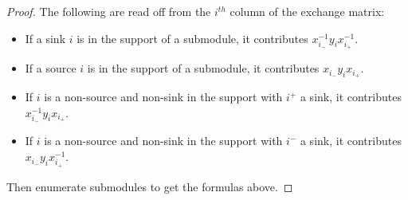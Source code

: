 \documentclass[12pt]{amsart}
\numberwithin{equation}{section}
\begin{document}
  \begin{proof}
    The following are read off from the $i^{th}$ column of the exchange matrix:
    \begin{itemize}
      \item If a sink $i$ is in the support of a submodule, it contributes $x_{i_-}^{-1}y_ix_{i_+}^{-1}$.
      \item If a source $i$ is in the support of a submodule, it contributes $x_{i_-}y_ix_{i_+}$.
      \item If $i$ is a non-source and non-sink in the support with $i^+$ a sink, it contributes $x_{i_-}^{-1}y_ix_{i_+}$.
      \item If $i$ is a non-source and non-sink in the support with $i^-$ a sink, it contributes $x_{i_-}y_ix_{i_+}^{-1}$.
    \end{itemize}
    Then enumerate submodules to get the formulas above.
  \end{proof}
\end{document}
